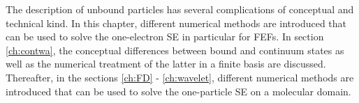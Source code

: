 The description of unbound particles has several complications of conceptual and technical kind.
In this chapter, different numerical methods are introduced that can be used to solve the one-electron SE in particular for FEFs.
In section \ref{ch:contwa}, the conceptual differences between bound and continuum states as well as the numerical treatment of the latter in a finite basis are discussed.
Thereafter, in the sections \ref{ch:FD} - \ref{ch:wavelet}, different numerical methods are introduced that can be used to solve the one-particle SE on a molecular domain.

